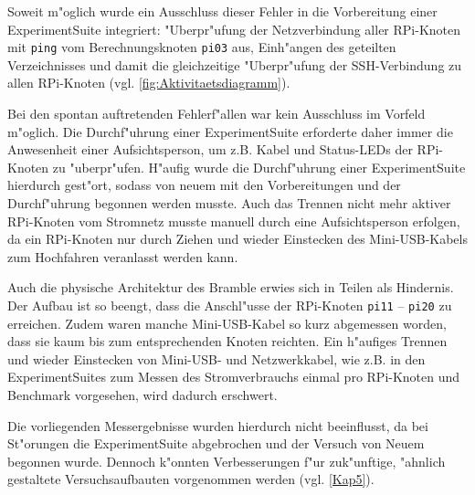 \noindent 
Soweit m"oglich wurde ein Ausschluss dieser Fehler in die Vorbereitung einer ExperimentSuite integriert: "Uberpr"ufung der Netzverbindung aller RPi-Knoten mit \texttt{ping} vom Berechnungsknoten \texttt{pi03} aus, Einh"angen des geteilten Verzeichnisses und damit die gleichzeitige "Uberpr"ufung der SSH-Verbindung zu allen RPi-Knoten (vgl. \ref{fig:Aktivitaetsdiagramm}). 

Bei den spontan auftretenden Fehlerf"allen war kein Ausschluss im Vorfeld m"oglich. Die Durchf"uhrung einer ExperimentSuite erforderte daher immer die Anwesenheit einer Aufsichtsperson, um z.B. Kabel und Status-LEDs der RPi-Knoten zu "uberpr"ufen. H"aufig wurde die Durchf"uhrung einer ExperimentSuite hierdurch gest"ort, sodass von neuem mit den Vorbereitungen und der Durchf"uhrung begonnen werden musste. Auch das Trennen nicht mehr aktiver RPi-Knoten vom Stromnetz musste manuell durch eine Aufsichtsperson erfolgen, da ein RPi-Knoten nur durch Ziehen und wieder Einstecken des Mini-USB-Kabels zum Hochfahren veranlasst werden kann. 

Auch die physische Architektur des Bramble erwies sich in Teilen als Hindernis. Der Aufbau ist so beengt, dass die Anschl"usse der RPi-Knoten \texttt{pi11} -- \texttt{pi20} zu erreichen. Zudem waren manche Mini-USB-Kabel so kurz abgemessen worden, dass sie kaum bis zum entsprechenden Knoten reichten. Ein h"aufiges Trennen und wieder Einstecken von Mini-USB- und Netzwerkkabel, wie z.B. in den ExperimentSuites zum Messen des Stromverbrauchs einmal pro RPi-Knoten und Benchmark vorgesehen, wird dadurch erschwert. 

Die vorliegenden Messergebnisse wurden hierdurch nicht beeinflusst, da bei St"orungen die ExperimentSuite abgebrochen und der Versuch von Neuem begonnen wurde. Dennoch k"onnten Verbesserungen f"ur zuk"unftige, "ahnlich gestaltete Versuchsaufbauten vorgenommen werden (vgl. \ref{Kap5}).
\endinput 
